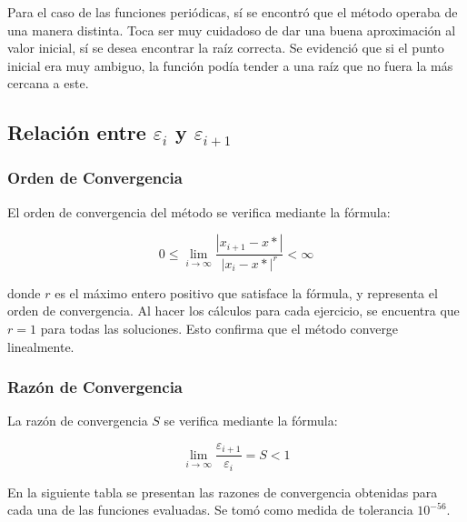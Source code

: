 \documentclass[a4paper,12pt]{article}
\begin{document}
Para el caso de las funciones periódicas, sí se encontró que el método operaba de una manera distinta. Toca ser muy cuidadoso de dar una buena aproximación al valor inicial, sí se desea encontrar la raíz correcta. Se evidenció que si el punto inicial era muy ambiguo, la función podía tender a una raíz que no fuera la más cercana a este. \par

\newpage

\subsection{Relación entre $\varepsilon_i$ y $\varepsilon_{i+1}$} 

\par

\subsubsection{Orden de Convergencia}

El orden de convergencia del método se verifica mediante la fórmula: \par

\[ 0 \leq \lim_{i\to\infty} \frac{|x_{i+1}-x*|}{|x_i-x*|^r} < \infty \]

donde $r$ es el máximo entero positivo que satisface la fórmula, y representa el orden de convergencia. Al hacer los cálculos para cada ejercicio, se encuentra que $r=1$ para todas las soluciones. Esto confirma que el método converge linealmente. \par

\subsubsection{Razón de Convergencia}

La razón de convergencia $S$ se verifica mediante la fórmula: \par

\[ \lim_{i\to\infty} \frac{\varepsilon_{i+1}}{\varepsilon_i} = S < 1\]

En la siguiente tabla se presentan las razones de convergencia obtenidas para cada una de las funciones evaluadas. Se tomó como medida de tolerancia $10^{-56}$. \par
\end{document}
